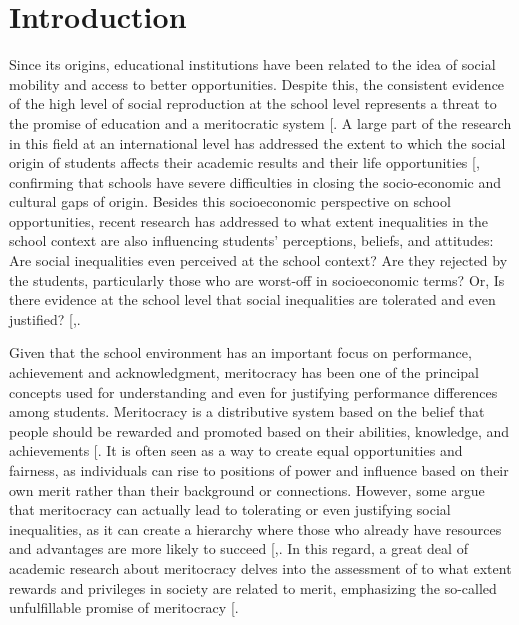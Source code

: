\documentclass[
  12pt,
  letterpaper,
]{article}
\begin{document}
\section{Introduction}\label{introduction}

Since its origins, educational institutions have been related to the
idea of social mobility and access to better opportunities. Despite
this, the consistent evidence of the high level of social reproduction
at the school level represents a threat to the promise of education and
a meritocratic system
{[}\citeproc{ref-bourdieu_reproduction_1990}{1}{]}. A large part of the
research in this field at an international level has addressed the
extent to which the social origin of students affects their academic
results and their life opportunities
{[}\citeproc{ref-vonhippel_test_2019}{2}{]}, confirming that schools
have severe difficulties in closing the socio-economic and cultural gaps
of origin. Besides this socioeconomic perspective on school
opportunities, recent research has addressed to what extent inequalities
in the school context are also influencing students' perceptions,
beliefs, and attitudes: Are social inequalities even perceived at the
school context? Are they rejected by the students, particularly those
who are worst-off in socioeconomic terms? Or, Is there evidence at the
school level that social inequalities are tolerated and even justified?
{[},\citeproc{ref-wiederkehr_belief_2015}{4}{]}.

Given that the school environment has an important focus on performance,
achievement and acknowledgment, meritocracy has been one of the
principal concepts used for understanding and even for justifying
performance differences among students. Meritocracy is a distributive
system based on the belief that people should be rewarded and promoted
based on their abilities, knowledge, and achievements
{[}\citeproc{ref-young_rise_1958}{5}{]}. It is often seen as a way to
create equal opportunities and fairness, as individuals can rise to
positions of power and influence based on their own merit rather than
their background or connections. However, some argue that meritocracy
can actually lead to tolerating or even justifying social inequalities,
as it can create a hierarchy where those who already have resources and
advantages are more likely to succeed
{[},\citeproc{ref-mcnamee_meritocracy_2004}{7}{]}.
In this regard, a great deal of academic research about meritocracy
delves into the assessment of to what extent rewards and privileges in
society are related to merit, emphasizing the so-called unfulfillable
promise of meritocracy {[}\citeproc{ref-mijs_stratified_2016}{8}{]}.
\end{document}
